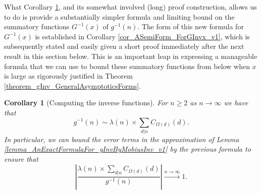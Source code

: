 \documentclass[11pt,reqno,a4letter]{article}
\numberwithin{figure}{section}
\numberwithin{table}{section}
\theoremstyle{plain}
\newtheorem{cor}[theorem]{Corollary}
\numberwithin{theorem}{section}
\theoremstyle{definition}
\begin{document}
What Corollary \ref{cor_ComputingInvFuncs_InPractice_DivSumgInvAst1_v1}, 
and its somewhat involved (long) proof construction, allows us to do is 
provide a substantially simpler formula and limiting bound on the summatory functions 
$G^{-1}(x)$ of $g^{-1}(n)$. The form of this new formula for $G^{-1}(x)$ is 
established in Corollary \ref{cor_ASemiForm_ForGInvx_v1}, which is subsequently stated and 
easily given a short proof immediately after the next result in this section below. 
This is an important leap in expressing a manageable formula that we can use to bound these 
summatory functions from below when $x$ is large as 
rigorously justified in Theorem \ref{theorem_gInv_GeneralAsymptoticsForms}. 

\begin{cor}[Computing the inverse functions] 
\label{cor_ComputingInvFuncs_InPractice_DivSumgInvAst1_v1} 
For $n \geq 2$ as $n \rightarrow \infty$ we have that 
\[
g^{-1}(n) \sim \lambda(n) \times \sum_{d|n} C_{\Omega(d)}(d). 
\]
In particular, we can bound the error terms in the approximation of 
Lemma \ref{lemma_AnExactFormulaFor_gInvByMobiusInv_v1} 
by the previous formula to ensure that 
\[
\left\lvert \frac{\lambda(n) \times \sum\limits_{d|n} C_{\Omega(d)}(d)}{g^{-1}(n)} \right\rvert 
     \xrightarrow{n \rightarrow \infty} 1. 
\]
\end{cor} 
\end{document}
